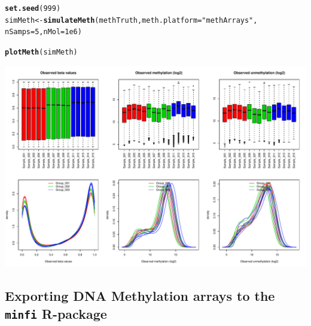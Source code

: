 \documentclass{article}\usepackage[]{graphicx}\usepackage[usenames,dvipsnames]{color}
\makeatletter
\def\maxwidth{ %
  \ifdim\Gin@nat@width>\linewidth
    \linewidth
  \else
    \Gin@nat@width
  \fi
}
\newcommand{\hlnum}[1]{\textcolor[rgb]{0.686,0.059,0.569}{#1}}%
\newcommand{\hlstr}[1]{\textcolor[rgb]{0.192,0.494,0.8}{#1}}%
\newcommand{\hlstd}[1]{\textcolor[rgb]{0.345,0.345,0.345}{#1}}%
\newcommand{\hlkwb}[1]{\textcolor[rgb]{0.69,0.353,0.396}{#1}}%
\newcommand{\hlkwc}[1]{\textcolor[rgb]{0.333,0.667,0.333}{#1}}%
\newcommand{\hlkwd}[1]{\textcolor[rgb]{0.737,0.353,0.396}{\textbf{#1}}}%
\newenvironment{kframe}{%
 \def\at@end@of@kframe{}%
 \ifinner\ifhmode%
  \def\at@end@of@kframe{\end{minipage}}%
  \begin{minipage}{\columnwidth}%
 \fi\fi%
 \def\FrameCommand##1{\hskip\@totalleftmargin \hskip-\fboxsep
 \colorbox{shadecolor}{##1}\hskip-\fboxsep
     \hskip-\linewidth \hskip-\@totalleftmargin \hskip\columnwidth}%
 \MakeFramed {\advance\hsize-\width
   \@totalleftmargin\z@ \linewidth\hsize
   \@setminipage}}%
 {\par\unskip\endMakeFramed%
 \at@end@of@kframe}
\newenvironment{knitrout}{}{} %
\makeatother
\begin{document}
\begin{knitrout}
\color{fgcolor}\begin{kframe}
\begin{alltt}
\hlkwd{set.seed}\hlstd{(}\hlnum{999}\hlstd{)}
\hlstd{simMeth} \hlkwb{<-} \hlkwd{simulateMeth}\hlstd{(methTruth,}  \hlkwc{meth.platform} \hlstd{=} \hlstr{"methArrays"}\hlstd{,}
                        \hlkwc{nSamps} \hlstd{=} \hlnum{5}\hlstd{,} \hlkwc{nMol} \hlstd{=} \hlnum{1e6}\hlstd{)}
\end{alltt}


{\ttfamily\noindent\itshape\color{messagecolor}{\#\# Simulating DNA methylation samples using the meth.platform: methArrays}}\begin{alltt}
\hlkwd{plotMeth}\hlstd{(simMeth)}
\end{alltt}
\end{kframe}
\includegraphics[width=\maxwidth]{figure/meth-figs-3groups-1} 

\end{knitrout}


\subsection{Exporting DNA Methylation arrays to the \texttt{minfi} R-package}
\end{document}

